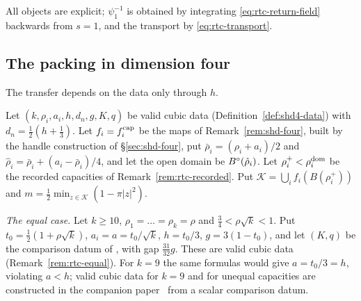 All objects are explicit; $\psi_1^{-1}$ is obtained by integrating \eqref{eq:rtc-return-field} backwards from $s=1$, and the transport by \eqref{eq:rtc-transport}.

\subsection{The packing in dimension four}\label{sec:rtc-packing}

The transfer depends on the data only through $h$.

\begin{construction}\label{cons:rtc-data}
Let $(k,\rho_i,a_i,h,d_n,g,K,q)$ be valid cubic data (Definition~\ref{def:shd4-data}) with $d_n=\frac12(h+\frac13)$. Let
$f_i=f_i^{\rm cap}$ be the maps of Remark~\ref{rem:shd-four}, built by the handle construction of \S\ref{sec:shd-four},
put $\bar\rho_i=(\rho_i+a_i)/2$ and $\hat\rho_i=\bar\rho_i+(a_i-\bar\rho_i)/4$, and let the open domain be
$B^{\circ}(\hat\rho_i)$. Let $\rho_i^+<\rho_i^{\rm dom}$ be the recorded capacities of Remark~\ref{rem:rtc-recorded}. Put
$\mathcal K=\bigcup_i f_i(B(\rho_i^+))$ and $m=\frac12\min_{z\in\mathcal K}(1-\pi|z|^2)$.

\emph{The equal case.} Let $k\ge10$, $\rho_1=\dots=\rho_k=\rho$ and $\frac34<\rho\sqrt k<1$. Put
$t_0=\frac12(1+\rho\sqrt k)$, $a_i=a=t_0/\sqrt k$, $h=t_0/3$, $g=3(1-t_0)$, and let $(K,q)$ be the comparison datum of
, with gap $\frac{31}{32}g$. These are valid cubic data
(Remark~\ref{rem:rtc-equal}). For $k=9$ the same formulas would give $a=t_0/3=h$, violating $a<h$; valid cubic data for
$k=9$ and for unequal capacities are constructed in the companion paper~\cite{SongHD} from a scalar comparison datum.
\end{construction}

